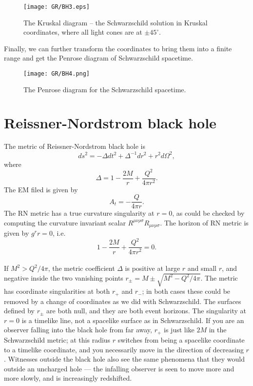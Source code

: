 \begin{figure}[!htb]
\centering
\texttt{[image: GR/BH3.eps]}
\caption{The Kruskal diagram -- the Schwarzschild solution in Kruskal coordinates, where all light cones are at $\pm 45^{\circ}$.}
\end{figure}

\noindent
Finally, we can further transform the coordinates to bring them into a finite range and get the Penrose diagram of Schwarzschild spacetime.

\begin{figure}[!htb]
\centering
\texttt{[image: GR/BH4.png]}
\caption{The Penrose diagram for the Schwarzschild spacetime.}
\end{figure}

\section{Reissner-Nordstrom black hole}
The metric of Reissner-Nordstrom black hole is
\[ds^2 = -\Delta dt^2 + \Delta^{-1}dr^2 + r^2d\Omega^2,\]
where
\[\Delta = 1 - \frac{2M}{r} + \frac{Q^2}{4 \pi r^2}.\]
The EM filed is given by
\[A_{t} = -\frac{Q}{4\pi r}.\]
The RN metric has a true curvature singularity at $r = 0$, as could be checked by computing the curvature invariant scalar $R^{\mu\nu\rho\sigma}R_{\mu\nu\rho\sigma}$. 
The horizon of RN metric is given by $g^{r}{r} = 0$, i.e.
\[1 - \frac{2M}{r} + \frac{Q^2}{4 \pi r^2} = 0.\]
\\
If $M^2 > Q^2 / 4 \pi$, the metric coefficient $\Delta$ is positive at large $r$ and small $r$, and negative inside the two vanishing points $r_{\pm} = M \pm \sqrt{M^2 - Q^2 / 4 \pi}$. 
The metric has coordinate singularities at both $r_{+}$ and $r_{-}$; in both cases these could be removed by a change of coordinates as we did with Schwarzschild.
The surfaces defined by $r_{\pm}$ are both null, and they are both event horizons. 
The singularity at $r = 0$ is a timelike line, not a spacelike surface as in Schwarzschild. 
If you are an observer falling into the black hole from far away, $r_{+}$ is just like $2M$ in the Schwarzschild metric; at this radius $r$ switches from being a spacelike coordinate to a timelike coordinate, and you necessarily move in the direction of decreasing $r$. 
Witnesses outside the black hole also see the same phenomena that they would outside an uncharged hole --- the infalling observer is seen to move more and more slowly, and is increasingly redshifted.
\\ \\
